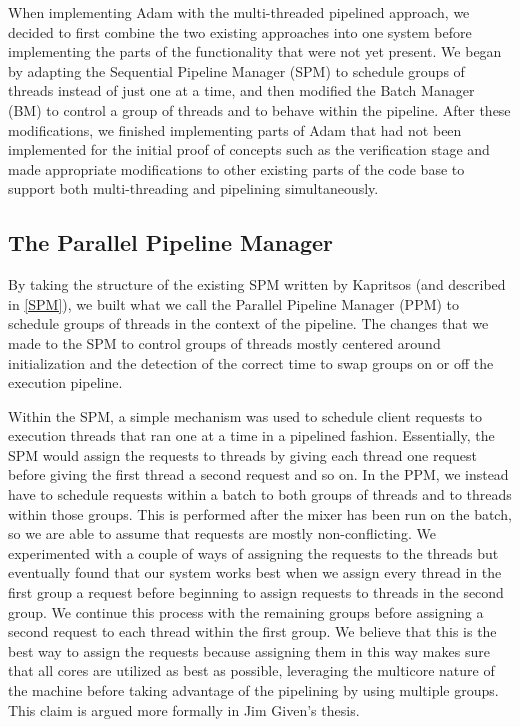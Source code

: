 \documentclass[11pt, oneside]{report}
\begin{document}
When implementing Adam with the multi-threaded pipelined approach, we decided to first combine the two existing approaches into one system before implementing the parts of the functionality that were not yet present. 
We began by adapting the Sequential Pipeline Manager (SPM) to schedule groups of threads instead of just one at a time, and then modified the Batch Manager (BM) to control a group of threads and to behave within the pipeline.
After these modifications, we finished implementing parts of Adam that had not been implemented for the initial proof of concepts such as the verification stage and made appropriate modifications to other existing parts of the code base to support both multi-threading and pipelining simultaneously.

\subsection{The Parallel Pipeline Manager}

By taking the structure of the existing SPM written by Kapritsos (and described in \ref{SPM}), we built what we call the Parallel Pipeline Manager (PPM) to schedule groups of threads in the context of the pipeline. 
The changes that we made to the SPM to control groups of threads mostly centered around initialization and the detection of the correct time to swap groups on or off the execution pipeline.

Within the SPM, a simple mechanism was used to schedule client requests to execution threads that ran one at a time in a pipelined fashion. 
Essentially, the SPM would assign the requests to threads by giving each thread one request before giving the first thread a second request and so on. 
In the PPM, we instead have to schedule requests within a batch to both groups of threads and to threads within those groups. 
This is performed after the mixer has been run on the batch, so we are able to assume that requests are mostly non-conflicting. 
We experimented with a couple of ways of assigning the requests to the threads but eventually found that our system works best when we assign every thread in the first group a request before beginning to assign requests to threads in the second group.
We continue this process with the remaining groups before assigning a second request to each thread within the first group. 
We believe that this is the best way to assign the requests because assigning them in this way makes sure that all cores are utilized as best as possible, leveraging the multicore nature of the machine before taking advantage of the pipelining by using multiple groups. This claim is argued more formally in Jim Given's thesis.
\end{document}
